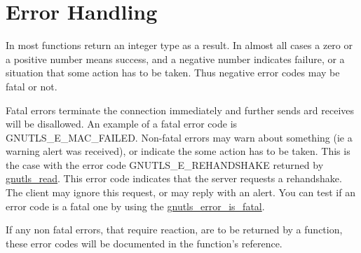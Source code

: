 \section{Error Handling}
\par
In \gnutls most functions return an integer type as a result.
In almost all cases a zero or a positive number means success, and
a negative number indicates failure, or a situation that some
action has to be taken. Thus negative error codes may be fatal
or not. 
\par 
Fatal errors terminate the connection immediately and
further sends ard receives will be disallowed. An example of
a fatal error code is GNUTLS\_E\_MAC\_FAILED. Non-fatal errors
may warn about something (ie a warning alert was received), or
indicate the some action has to be taken. This is the case with
the error code GNUTLS\_E\_REHANDSHAKE returned by 
\hyperref{gnutls\_read()}{gnutls\_read() (see Section }{)}{gnutls_read}.
This error code indicates that the server requests a rehandshake. The client
may ignore this request, or may reply with an alert.
You can test if an error code is a fatal one by using the
\hyperref{gnutls\_error\_is\_fatal()}{gnutls\_error\_is\_fatal() (see Section }{)}{gnutls_error_is_fatal}.
\par
If any non fatal errors, that require reaction, are to be returned by a
function, these error codes will be documented
in the function's reference.

